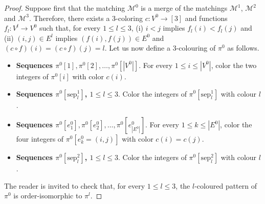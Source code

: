 \begin{proof}
  Suppose first 
  that the matching $\mathcal{M}^0$ is a merge of the matchings
  $\mathcal{M}^1$, $\mathcal{M}^2$ and $\mathcal{M}^3$.
  Therefore, there exists a $3$-coloring $c : V^0 \to [3]$
  and functions $f_l : V^l \to V^0$ such that, for every $1 \leq l \leq 3$,
  (i) $i < j$ implies $f_l(i) < f_l(j)$ and  
  (ii) $(i, j) \in E^l$ implies $(f(i), f(j)) \in E^0$ and $(c \circ f)(i) = (c \circ f)(j) = l$.
  Let us now define a $3$-colouring of $\pi^0$ as follows.
  \begin{itemize}
    \item \textbf{Sequences $\pi^0[1], \pi^0[2], \dots, \pi^0[|V^0|]$}.
    For every $1 \leq i \leq |V^0|$, color the two integers of $\pi^0[i]$ with color $c(i)$.
    \item \textbf{Sequences $\pi^0[\text{sep}^{1}_{l}]$, $1 \leq l \leq 3$}.
    Color the integers of $\pi^0[\text{sep}^{1}_{l}]$ with colour $l$.
    \item \textbf{Sequences $\pi^0[e^0_1], \pi^0[e^0_2], \dots, \pi^0[e^0_{|E^0|}]$}.
    For every $1 \leq k \leq |E^0|$, color the four integers of $\pi^0[e^0_k = (i, j)]$ with color $c(i) = c(j)$.
    \item \textbf{Sequences $\pi^0[\text{sep}^{2}_{l}]$, $1 \leq l \leq 3$}.
    Color the integers of $\pi^0[\text{sep}^{2}_{l}]$ with colour $l$.
  \end{itemize}
  The reader is invited to check that, for every $1 \leq l \leq 3$,
  the $l$-coloured pattern of $\pi^0$ is order-isomorphic to $\pi^l$.


\end{proof}
